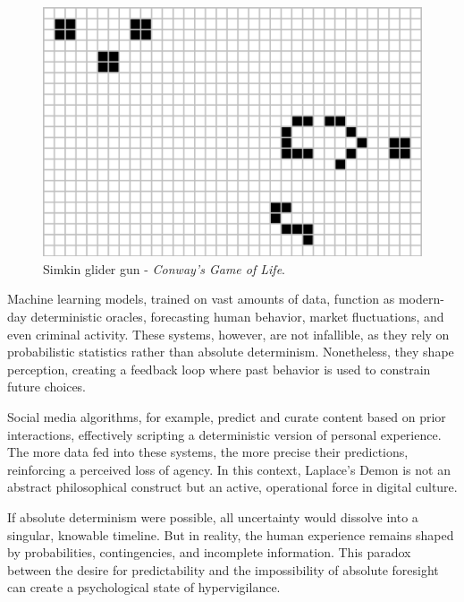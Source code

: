 \begin{figure}
    \centering
    \includegraphics[width=0.8\linewidth]{assets/gol.png} 
    \caption{\small Simkin glider gun - \textit{Conway's Game of Life}.}
    \label{fig:gol}
\end{figure}

Machine learning models, trained on vast amounts of data, function as modern-day deterministic oracles, forecasting human behavior, market fluctuations, and even criminal activity. These systems, however, are not infallible, as they rely on probabilistic statistics rather than absolute determinism. Nonetheless, they shape perception, creating a feedback loop where past behavior is used to constrain future choices.

Social media algorithms, for example, predict and curate content based on prior interactions, effectively scripting a deterministic version of personal experience. The more data fed into these systems, the more precise their predictions, reinforcing a perceived loss of agency. In this context, Laplace's Demon is not an abstract philosophical construct but an active, operational force in digital culture.

If absolute determinism were possible, all uncertainty would dissolve into a singular, knowable timeline. But in reality, the human experience remains shaped by probabilities, contingencies, and incomplete information. This paradox between the desire for predictability and the impossibility of absolute foresight can create a psychological state of hypervigilance.

